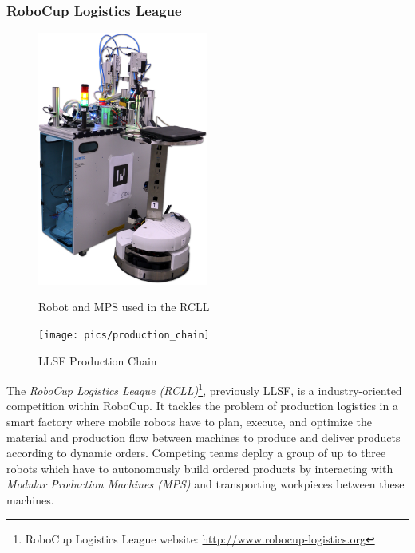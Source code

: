 \documentclass[a4paper,11pt]{article}
\begin{document}
\subsubsection{RoboCup Logistics League}
\begin{figure}
  \begin{minipage}[b]{0.5\linewidth}
    \centering
    \includegraphics[width=0.5\textwidth]{img/rcll}
    \caption{Robot and MPS used in the RCLL}
    \label{fig:rcll}
  \end{minipage}
\quad
\begin{minipage}[b]{0.5\linewidth}
  \texttt{[image: pics/production\_chain]}
  \caption[LLSF Production Chain]{LLSF Production Chain~\cite{LLSFRules}}
  \label{fig:llsf_chain}
\end{minipage}
\end{figure}

%
The \textit{RoboCup Logistics League (RCLL)}\footnote{RoboCup
  Logistics League website: \url{http://www.robocup-logistics.org}},
previously LLSF, is a industry-oriented competition within RoboCup.
It tackles the problem of production logistics in a smart factory
where mobile robots have to plan, execute, and optimize the material
and production flow between machines to produce and deliver products
according to dynamic orders. Competing teams deploy a group of up to
three robots which have to autonomously build ordered products by
interacting with \textit{Modular Production Machines (MPS)} and
transporting workpieces between these machines.
\end{document}
